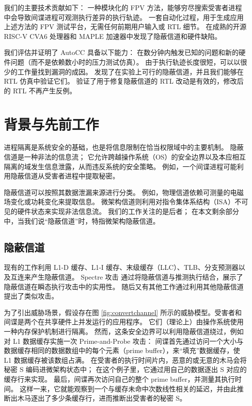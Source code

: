 我们的主要技术贡献如下：
 一种模块化的 FPV 方法，能够穷尽搜索受害者进程中会导致间谍进程可观测执行差异的执行轨迹。
  一套自动化过程，用于生成应用上述方法的 FPV 测试平台，无需任何前期用户输入或 RTL 细节。
  在成熟的开源 RISC-V CVA6 处理器和 MAPLE 加速器中发现了隐蔽信道和硬件缺陷。


我们评估并证明了 AutoCC 具备以下能力：
 在数分钟内触发已知的问题和新的硬件问题（而不是依赖数小时的压力测试仿真）。
 由于执行轨迹长度很短，可以以很少的工作量找到漏洞的成因。
 发现了在实验上可行的隐蔽信道，并且我们能够在 RTL 仿真中验证它们。
 验证了用于修复隐蔽信道的 RTL 改动是有效的，修改后的 RTL 不再产生反例。


\section{背景与先前工作}
进程隔离是系统安全的基础，也是将信息限制在恰当权限域中的主要机制。
隐蔽信道是一种非法的信息流；
它允许跨越操作系统（OS）的安全边界以及本应相互隔离的域发生信息泄露，从而违反系统的安全策略。
例如，一个间谍进程可能利用隐蔽信道从受害者进程中提取秘密。

隐蔽信道可以按照其数据泄漏来源进行分类。
例如，物理信道依赖可测量的电磁场变化或功耗变化来提取信息。
微架构信道则利用对指令集体系结构（ISA）不可见的硬件状态来实现非法信息流。
我们的工作关注的是后者；
在本文剩余部分中，当我们说“隐蔽信道”时，特指微架构隐蔽信道。

\subsection{隐蔽信道}

现有的工作利用 L1-D 缓存、L1-I 缓存、末级缓存（LLC）、TLB、分支预测器以及互连来产生隐蔽信道。
Spectre 攻击 通过将隐蔽信道与推测执行结合，展示了隐蔽信道在瞬态执行攻击中的实用性。
随后又有其他工作通过利用其他隐蔽信道提出了类似攻击。

为了引出威胁场景，假设存在图 \ref{fig:convertchannel} 所示的威胁模型。受害者和间谍是两个在共享硬件上并发运行的应用程序。
它们（理论上）由操作系统使用一种内存保护机制进行隔离。
然而，这条安全边界可以利用隐蔽信道绕过，例如对 L1 数据缓存实施一次 Prime-and-Probe 攻击：
间谍首先通过访问一个大小与数据缓存相同的数据数组中的每个元素（prime buffer），来“填充”数据缓存，使 L1 数据缓存被该数组占满。
在受害者的执行时间片内，恶意的或无意的木马会将秘密 S 编码进微架构状态中；
在这个例子里，它通过用自己的数据逐出 S 对应的缓存行来实现。
最后，间谍再次访问自己的整个 prime buffer，并测量其执行时间。
这样一来，它就能观察到一个与缓存未命中次数线性相关的延迟，并由此推断出木马逐出了多少条缓存行，进而推断出受害者的秘密 S。

